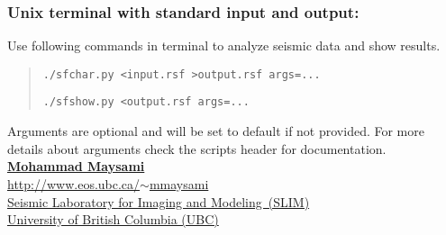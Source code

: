\documentclass[12pt,titlepage]{article}
\begin{document}
\subsubsection*{Unix terminal with standard input and output:}
Use following commands in terminal to analyze seismic data and show
results.
\begin{verse}
  \texttt{./sfchar.py <input.rsf >output.rsf args=...}

  \texttt{./sfshow.py <output.rsf           args=...}
\end{verse}
%
Arguments are optional and will be set to default if not provided. For more details about arguments check the scripts header for documentation.\\[20pt]
%
%
\href{mailto:mmaysami@eos.ubc.ca}{\textbf{Mohammad Maysami}}\\
\href{http://www.eos.ubc.ca/~mmaysami}{http://www.eos.ubc.ca/$\sim$mmaysami}\\
\href{http://slim.eos.ubc.ca}{Seismic Laboratory for Imaging and Modeling~(SLIM)}\\ 
\href{http://www.ubc.ca}{University of British Columbia (UBC)}
\end{document}
